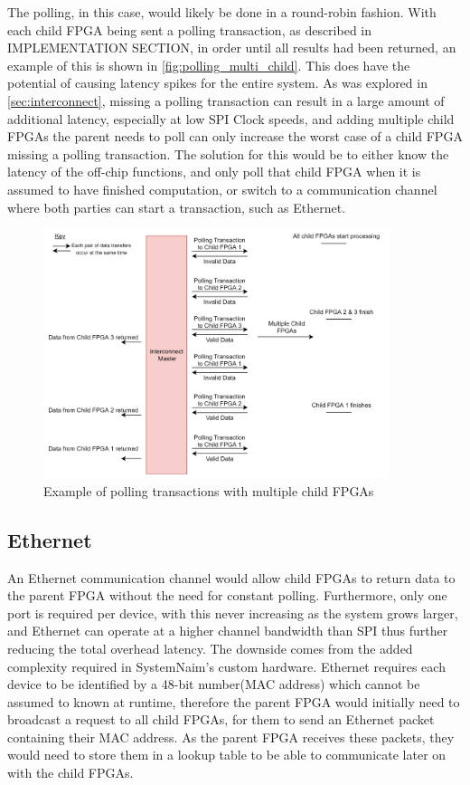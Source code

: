 The polling, in this case, would likely be done in a round-robin fashion. With each child FPGA being sent a polling transaction, as described in IMPLEMENTATION SECTION, in order until all results had been returned, an example of this is shown in  \autoref{fig:polling_multi_child}. This does have the potential of causing latency spikes for the entire system. As was explored in \autoref{sec:interconnect}, missing a polling transaction can result in a large amount of additional latency, especially at low SPI Clock speeds, and adding multiple child FPGAs the parent needs to poll can only increase the worst case of a child FPGA missing a polling transaction. The solution for this would be to either know the latency of the off-chip functions, and only poll that child FPGA when it is assumed to have finished computation, or switch to a communication channel where both parties can start a transaction, such as Ethernet.

\begin{figure}[!htb]
    \centering
    \includegraphics[width=0.9\textwidth]{06_future_work/images/interconnect_polling_multi_child.png}
    \caption{Example of polling transactions with multiple child FPGAs}
    \label{fig:polling_multi_child}
\end{figure}

\subsection{Ethernet}

An Ethernet communication channel would allow child FPGAs to return data to the parent FPGA without the need for constant polling. Furthermore, only one port is required per device, with this never increasing as the system grows larger, and Ethernet can operate at a higher channel bandwidth than SPI thus further reducing the total overhead latency. The downside comes from the added complexity required in SystemNaim's custom hardware. Ethernet requires each device to be identified by a 48-bit number(MAC address) which cannot be assumed to known at runtime, therefore the parent FPGA would initially need to broadcast a request to all child FPGAs, for them to send an Ethernet packet containing their MAC address. As the parent FPGA receives these packets, they would need to store them in a lookup table to be able to communicate later on with the child FPGAs.

